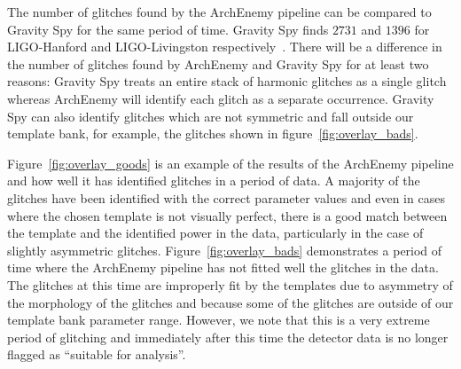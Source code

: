 The number of \scl{} glitches found by the ArchEnemy pipeline can be compared to Gravity Spy for the same period of time. Gravity Spy finds $2731$ and $1396$ for LIGO-Hanford and LIGO-Livingston respectively~\cite{gravityspy}. There will be a difference in the number of glitches found by ArchEnemy and Gravity Spy for at least two reasons: Gravity Spy treats an entire stack of harmonic glitches as a single \scl{} glitch whereas ArchEnemy will identify each glitch as a separate occurrence. Gravity Spy can also identify \scl{} glitches which are not symmetric and fall outside our template bank, for example, the \scl{} glitches shown in figure~\ref{fig:overlay_bads}.

Figure~\ref{fig:overlay_goods} is an example of the results of the ArchEnemy pipeline and how well it has identified \scl{} glitches in a period of data. A majority of the glitches have been identified with the correct parameter values and even in cases where the chosen template is not visually perfect, there is a good match between the template and the identified power in the data, particularly in the case of slightly asymmetric glitches. Figure~\ref{fig:overlay_bads} demonstrates a period of time where the ArchEnemy pipeline has not fitted well the \scl{} glitches in the data. The glitches at this time are improperly fit by the templates due to asymmetry of the morphology of the glitches and because some of the glitches are outside of our template bank parameter range. However, we note that this is a very extreme period of \scl{} glitching and immediately after this time the detector data is no longer flagged as ``suitable for analysis''.

